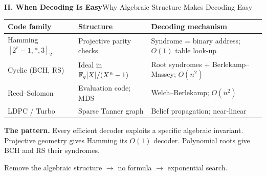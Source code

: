 \begin{frame}{\textbf{II. When Decoding Is Easy}}{Why Algebraic Structure Makes Decoding Easy}
\small
\begin{center}
\renewcommand{\arraystretch}{1.28}
\begin{tabular}{p{}p{}p{}}
\toprule
Code family & Structure & Decoding mechanism \\
\midrule
Hamming $[2^r-1,*,3]_2$ & Projective parity checks & Syndrome = binary address; $O(1)$ table look-up \\
Cyclic (BCH, RS) & Ideal in $\mathbb{F}_q[X]/(X^n-1)$ & Root syndromes + Berlekamp--Massey; $O(n^2)$ \\
Reed--Solomon & Evaluation code; MDS & Welch--Berlekamp; $O(n^2)$ \\
LDPC / Turbo & Sparse Tanner graph & Belief propagation; near-linear \\
\bottomrule
\end{tabular}
\end{center}
\bigskip
\textbf{The pattern.}\;
Every efficient decoder exploits a specific algebraic invariant.
Projective geometry gives Hamming its $O(1)$ decoder.
Polynomial roots give BCH and RS their syndromes.
\medskip
\begin{alertblock}{}
\centering
Remove the algebraic structure \textbf{$\rightarrow$} no formula \textbf{$\rightarrow$} exponential search.
\end{alertblock}
\end{frame}

